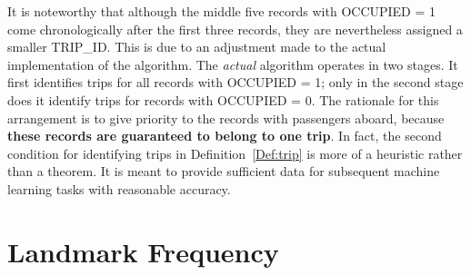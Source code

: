 It is noteworthy that although the middle five records with OCCUPIED = 1 come chronologically after the first three records, they are nevertheless assigned a smaller TRIP\_ID. This is due to an adjustment made to the actual implementation of the algorithm. The \emph{actual} algorithm operates in two stages. It first identifies trips for all records with OCCUPIED = 1; only in the second stage does it identify trips for records with OCCUPIED = 0. The rationale for this arrangement is to give priority to the records with passengers aboard, because \textbf{these records are guaranteed to belong to one trip}. In fact, the second condition for identifying trips in Definition~\ref{Def:trip} is more of a heuristic rather than a theorem. It is meant to provide sufficient data for subsequent machine learning tasks with reasonable accuracy.

\section{Landmark Frequency}

\begin{table}[h]
\centering
{}
\caption{An illustration of frequency counting}\label{Ta:frequency_count}
\end{table}

